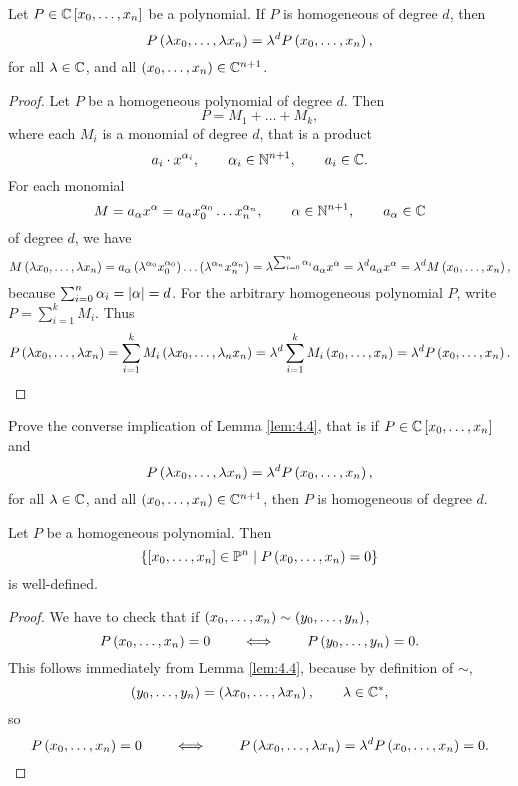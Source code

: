 \pagebreak

\begin{lemma}
\label{lem:4.4}
Let $ P \in \mathbb{C}\left[ x_0, \dots, x_n \right] $ be a polynomial. If $ P $ is homogeneous of degree $ d $, then
$$ P\left( \lambda x_0, \dots, \lambda x_n \right) = \lambda^dP\left( x_0, \dots, x_n \right), $$ for all $ \lambda \in \mathbb{C} $, and all $ \left( x_0, \dots, x_n \right) \in \mathbb{C}^{n + 1} $.
\end{lemma}

\begin{proof}
Let $ P $ be a homogeneous polynomial of degree $ d $. Then
$$ P = M_1 + \dots + M_k, $$
where each $ M_i $ is a monomial of degree $ d $, that is a product
$$ a_i \cdot x^{\alpha_i}, \qquad \alpha_i \in \mathbb{N}^{n + 1}, \qquad a_i \in \mathbb{C}. $$
For each monomial
$$ M = a_\alpha x^\alpha = a_\alpha x_0^{\alpha_0} \dots x_n^{\alpha_n}, \qquad \alpha \in \mathbb{N}^{n + 1}, \qquad a_\alpha \in \mathbb{C} $$
of degree $ d $, we have
$$ M\left( \lambda x_0, \dots, \lambda x_n \right) = a_\alpha\left( \lambda^{\alpha_0}x_0^{\alpha_0} \right) \dots \left( \lambda^{\alpha_n}x_n^{\alpha_n} \right) = \lambda^{\sum_{i = 0}^n \alpha_i}a_\alpha x^\alpha = \lambda^da_\alpha x^\alpha = \lambda^dM\left( x_0, \dots, x_n \right), $$
because $ \sum_{i = 0}^n \alpha_i = \left\lvert \alpha \right\rvert = d $. For the arbitrary homogeneous polynomial $ P $, write $ P = \sum_{i = 1}^k M_i $. Thus
$$ P\left( \lambda x_0, \dots, \lambda x_n \right) = \sum_{i = 1}^k M_i\left( \lambda x_0, \dots, \lambda_n x_n \right) = \lambda^d\sum_{i = 1}^k M_i\left( x_0, \dots, x_n \right) = \lambda^dP\left( x_0, \dots, x_n \right). $$
\end{proof}

\begin{exercise}
Prove the converse implication of Lemma \ref{lem:4.4}, that is if $ P \in \mathbb{C}\left[ x_0, \dots, x_n \right] $ and
$$ P\left( \lambda x_0, \dots, \lambda x_n \right) = \lambda^dP\left( x_0, \dots, x_n \right), $$
for all $ \lambda \in \mathbb{C} $, and all $ \left( x_0, \dots, x_n \right) \in \mathbb{C}^{n + 1} $, then $ P $ is homogeneous of degree $ d $.
\end{exercise}

\begin{proposition}
Let $ P $ be a homogeneous polynomial. Then
$$ \left\{ \left[ x_0, \dots, x_n \right] \in \mathbb{P}^n \mid P\left( x_0, \dots, x_n \right) = 0 \right\} $$
is well-defined.
\end{proposition}

\begin{proof}
We have to check that if $ \left( x_0, \dots, x_n \right) \sim \left( y_0, \dots, y_n \right) $,
$$ P\left( x_0, \dots, x_n \right) = 0 \qquad \iff \qquad P\left( y_0, \dots, y_n \right) = 0. $$
This follows immediately from Lemma \ref{lem:4.4}, because by definition of $ \sim $,
$$ \left( y_0, \dots, y_n \right) = \left( \lambda x_0, \dots, \lambda x_n \right), \qquad \lambda \in \mathbb{C}^*, $$
so
$$ P\left( x_0, \dots, x_n \right) = 0 \qquad \iff \qquad P\left( \lambda x_0, \dots, \lambda x_n \right) = \lambda^dP\left( x_0, \dots, x_n \right) = 0. $$
\end{proof}

